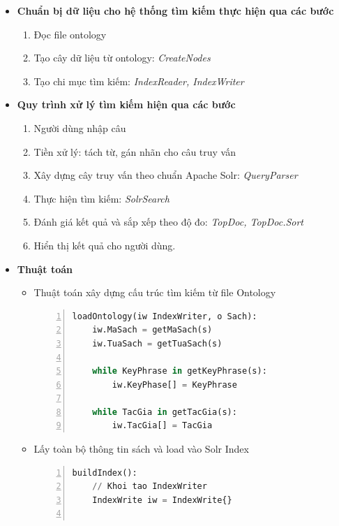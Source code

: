     
\begin{itemize}
    \item \textbf{Chuẩn bị dữ liệu cho hệ thống tìm kiếm thực hiện qua các bước}
    \begin{enumerate}
        \item Đọc file ontology
        \item Tạo cây dữ liệu từ ontology: \textit{CreateNodes}
        \item Tạo chi mục tìm kiếm: \textit{IndexReader, IndexWriter}
    \end{enumerate}
    
    \item \textbf{Quy trình xử lý tìm kiếm hiện qua các bước}
    \begin{enumerate}
        \item Người dùng nhập câu
        \item Tiền xử lý: tách từ, gán nhãn cho câu truy vấn
        \item Xây dựng cây truy vấn theo chuẩn Apache Solr: \textit{QueryParser}
        \item Thực hiện tìm kiếm: \textit{SolrSearch}
        \item Đánh giá kết quả và sắp xếp theo độ đo: \textit{TopDoc, TopDoc.Sort}
        \item Hiển thị kết quả cho người dùng.
    \end{enumerate}
    
    
    \item \textbf{Thuật toán}
    \begin{itemize}
        \item Thuật toán xây dựng cấu trúc tìm kiếm từ file Ontology
        
        \begin{lstlisting}[language=Python,numbers=left,frame=single, basicstyle=\ttfamily\small]
loadOntology(iw IndexWriter, o Sach):
    iw.MaSach = getMaSach(s)
    iw.TuaSach = getTuaSach(s)
    
    while KeyPhrase in getKeyPhrase(s):
        iw.KeyPhase[] = KeyPhrase
        
    while TacGia in getTacGia(s):
        iw.TacGia[] = TacGia
        \end{lstlisting}

    \item Lấy toàn bộ thông tin sách và load vào Solr Index

 \begin{lstlisting}[language=Python,numbers=left,frame=single, basicstyle=\ttfamily\small]
buildIndex():
    // Khoi tao IndexWriter
    IndexWrite iw = IndexWrite{}
    

\end{lstlisting}
\end{itemize}
\end{itemize}
